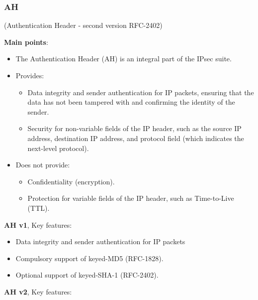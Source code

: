 \subsubsection{AH}
\begin{center}
    (Authentication Header - second version RFC-2402)
\end{center}
\textbf{Main points}:
\begin{itemize}
    \item The Authentication Header (AH) is an integral part of the IPsec suite.
    \item Provides:
    \begin{itemize}
        \item Data integrity and sender authentication for IP packets, ensuring that the data has not been tampered with and confirming the identity of the sender.
        \item Security for non-variable fields of the IP header, such as the source IP address, destination IP address, and protocol field (which indicates the next-level protocol).
    \end{itemize}
    \item Does not provide:
    \begin{itemize}
        \item Confidentiality (encryption).
        \item Protection for variable fields of the IP header, such as Time-to-Live (TTL).
    \end{itemize}
\end{itemize}

\hfill

\textbf{AH v1}, Key features:

\begin{itemize}
    \item Data integrity and sender authentication for IP packets
    \item Compulsory support of keyed-MD5 (RFC-1828).
    \item Optional support of keyed-SHA-1 (RFC-2402).
\end{itemize}

\hfill

\textbf{AH v2}, Key features:


